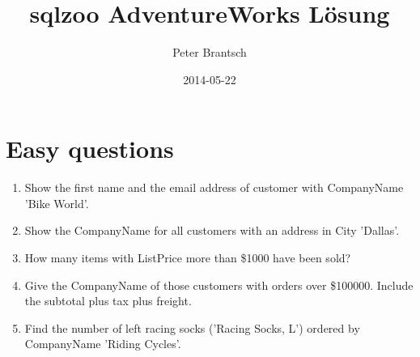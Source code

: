 \documentclass[a4paper]{article}
\begin{document}
	\title{sqlzoo AdventureWorks Lösung}
	\date{2014-05-22}
	\author{Peter Brantsch}
	\maketitle

	\section{Easy questions}
	\begin{enumerate}
		\item Show the first name and the email address of customer with
		CompanyName 'Bike World'.
			
		\item Show the CompanyName for all customers with an address in City
		'Dallas'.
			
		\item How many items with ListPrice more than \$1000 have been sold?
			
		\item Give the CompanyName of those customers with orders over
		\$100000. Include the subtotal plus tax plus freight.
			
		\item Find the number of left racing socks ('Racing Socks, L') ordered
		by CompanyName 'Riding Cycles'.
			
	\end{enumerate}


\end{document}
